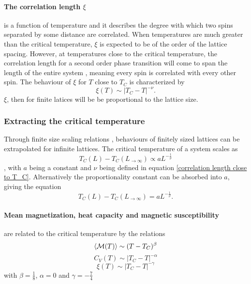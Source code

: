 \documentclass[10pt,a4paper]{article}
\begin{document}
\paragraph{The correlation length $\xi$}is a function of temperature and it describes the degree with which two spins separated by some distance are correlated. When temperatures are much greater than the critical temperature, $\xi$ is expected to be of the order of the lattice spacing. However, at temperatures close to the critical temperature, the correlation length for a second order phase transition will come to span the length of the entire system \cite{Problem_set_4}, meaning every spin is correlated with every other spin. The behaviour of $\xi$ for $T$ close to $T_C$ is characterized by
\begin{equation}\label{correlation length close to T_C}
\xi(T)\sim \left| T_C-T \right|^{-\nu}.
\end{equation}
$\xi$, then for finite latices will be be proportional to the lattice size.
\subsubsection{Extracting the critical temperature}\label{Extracting the critical temperature}
Through finite size scaling relations \cite{Problem_set_4}, behaviours of finitely sized lattices can be extrapolated for infinite lattices. The critical temperature of a system scales as
\begin{equation}\label{Critical temperature with infinity equation}
T_C(L) -T_C(L_{\rightarrow \infty}) \propto aL^{-\frac{1}{\nu}}
\end{equation}
\cite{Lecture_Notes_Fall_2015}, with $a$ being a constant and $\nu$ being defined in equation \eqref{correlation length close to T_C}. Alternatively the proportionality constant can be absorbed into $a$, giving the equation
\begin{equation*}
T_C(L) -T_C(L_{\rightarrow \infty}) = aL^{-\frac{1}{\nu}}.
\end{equation*}
\paragraph{Mean magnetization, heat capacity and magnetic susceptibility}are related to the critical temperature by the relations
\begin{equation}
\braket{\mathcal{M}(T)} \sim (T-T_C)^\beta
\end{equation}
\begin{equation}
C_V(T) \sim |T_C-T|^{-\alpha}
\end{equation}
\begin{equation}
\xi(T) \sim |T_C-T|^{-\gamma}
\end{equation}
with $\beta=\frac{1}{8}$, $\alpha=0$ and $\gamma = -\frac{7}{4}$ \cite{Lecture_Notes_Fall_2015}
\end{document}
